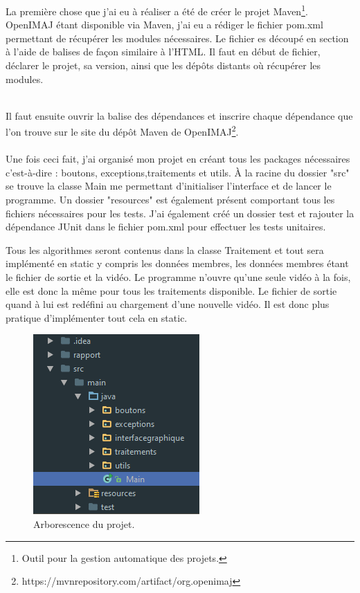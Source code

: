 \documentclass[10pt,a4paper]{article}
\begin{document}
La première chose que j'ai eu à réaliser a été de créer le projet Maven\footnote{Outil pour la gestion automatique des projets.}. OpenIMAJ étant disponible via Maven,
j'ai eu a rédiger le fichier pom.xml permettant de récupérer les modules nécessaires. Le fichier es découpé en section à l'aide de balises de façon similaire à l'HTML. Il faut en début de fichier,
déclarer le projet, sa version, ainsi que les dépôts distants où récupérer les modules. \newpage



~~\\
Il faut ensuite ouvrir la balise des dépendances et inscrire chaque dépendance que l'on trouve sur le site du dépôt Maven de OpenIMAJ\footnote{https://mvnrepository.com/artifact/org.openimaj}.\\


~~\\

Une fois ceci fait, j'ai organisé mon projet en créant tous les packages nécessaires c'est-à-dire : boutons, exceptions,traitements et utils.
À la racine du dossier "src" se trouve la classe Main me permettant d'initialiser l'interface et de lancer le programme. Un dossier "resources" est également présent comportant tous les fichiers
nécessaires pour les tests. J'ai également créé un dossier test et rajouter la dépendance JUnit dans le fichier pom.xml pour effectuer les tests unitaires.

Tous les algorithmes seront contenus dans la classe Traitement et tout sera implémenté en static y compris les données membres, les données membres étant le fichier de sortie et la vidéo.
Le programme n'ouvre qu'une seule vidéo à la fois, elle est donc la même pour tous les traitements disponible. Le fichier de sortie quand à lui est redéfini au chargement d'une nouvelle vidéo.
Il est donc plus pratique d'implémenter tout cela en static.

\begin{figure}[!h]
\center
\includegraphics[scale = 1]{tree.PNG}
\caption{Arborescence du projet.}
\end{figure}
\end{document}
